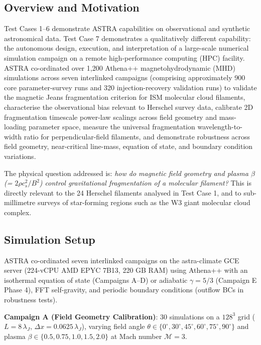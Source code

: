 \documentclass[usenatbib]{rasti}
\begin{document}
\subsection{Overview and Motivation}

Test Cases 1--6 demonstrate ASTRA capabilities on observational and synthetic astronomical data.
Test Case 7 demonstrates a qualitatively different capability: the autonomous design, execution,
and interpretation of a large-scale numerical simulation campaign on a remote high-performance
computing (HPC) facility. ASTRA co-ordinated over 1,200 Athena++ \citep{stone2020} magnetohydrodynamic
(MHD) simulations across seven interlinked campaigns (comprising approximately 900 core parameter-survey
runs and 320 injection-recovery validation runs) to validate the magnetic Jeans fragmentation
criterion for ISM molecular cloud filaments, characterise the observational bias relevant to
Herschel survey data, calibrate 2D fragmentation timescale power-law scalings across field
geometry and mass-loading parameter space, measure the universal fragmentation wavelength-to-width
ratio for perpendicular-field filaments, and demonstrate robustness across field geometry, near-critical
line-mass, equation of state, and boundary condition variations.

The physical question addressed is: \emph{how do magnetic field geometry and plasma
$\beta$ (= $2\rho c_s^2 / B^2$) control gravitational fragmentation of a molecular filament?}
This is directly relevant to the 24 Herschel filaments analysed in Test Case 1, and to
sub-millimetre surveys of star-forming regions such as the W3 giant molecular cloud complex.

\subsection{Simulation Setup}

ASTRA co-ordinated seven interlinked campaigns on the astra-climate GCE server (224-vCPU AMD
EPYC 7B13, 220 GB RAM) using Athena++ with an isothermal equation of state (Campaigns A--D)
or adiabatic $\gamma = 5/3$ (Campaign E Phase 4), FFT self-gravity,
and periodic boundary conditions (outflow BCs in robustness tests).

\textbf{Campaign A (Field Geometry Calibration)}: 30 simulations on a $128^3$ grid
($L = 8\,\lambda_J$, $\Delta x = 0.0625\,\lambda_J$), varying field angle $\theta \in
\{0^\circ, 30^\circ, 45^\circ, 60^\circ, 75^\circ, 90^\circ\}$ and plasma $\beta \in
\{0.5, 0.75, 1.0, 1.5, 2.0\}$ at Mach number $\mathcal{M} = 3$.
\end{document}

